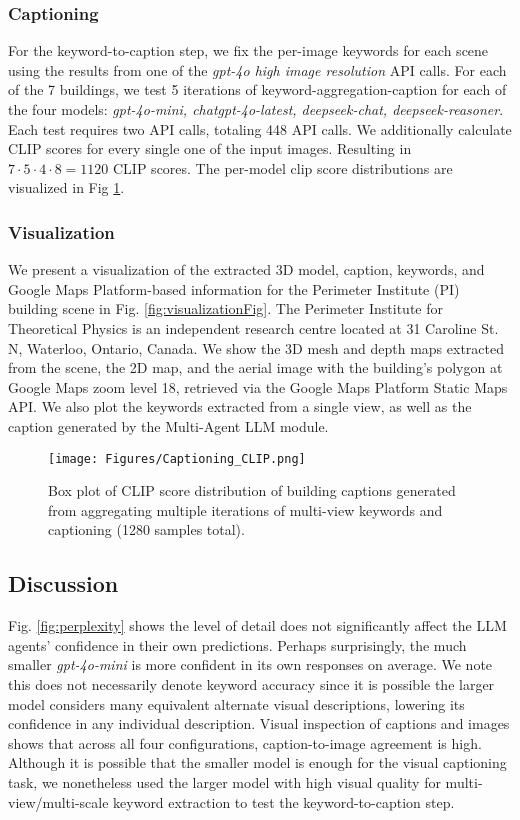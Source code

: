 
\subsubsection{Captioning}
For the keyword-to-caption step, we fix the per-image keywords for each scene using the results from one of the \textit{gpt-4o high image resolution} API calls. For each of the 7 buildings, we test 5 iterations of keyword-aggregation-caption for each of the four models: \textit{gpt-4o-mini, chatgpt-4o-latest, deepseek-chat, deepseek-reasoner}. Each test requires two API calls, totaling 448 API calls. We additionally calculate CLIP scores for every single one of the input images. Resulting in $7\cdot5\cdot4\cdot8 = 1120$ CLIP scores. The per-model clip score distributions are visualized in Fig \ref{fig:4ModelsCaptionCLIp}.

\subsubsection{Visualization}
We present a visualization of the extracted 3D model, caption, keywords, and Google Maps Platform-based information for the Perimeter Institute (PI) building scene in Fig. \ref{fig:visualizationFig}. The Perimeter Institute for Theoretical Physics is an independent research centre located at 31 Caroline St. N, Waterloo, Ontario, Canada. We show the 3D mesh and depth maps extracted from the scene, the 2D map, and the aerial image with the building's polygon at Google Maps zoom level 18, retrieved via the Google Maps Platform Static Maps API. We also plot the keywords extracted from a single view, as well as the caption generated by the Multi-Agent LLM module.
\begin{figure}[htpb]
\centering
\texttt{[image: Figures/Captioning\_CLIP.png]}
\caption{Box plot of CLIP score distribution of building captions generated from aggregating multiple iterations of multi-view keywords and captioning (1280 samples total).}\label{fig:4ModelsCaptionCLIp}
\end{figure}




\subsection{Discussion}
Fig. \ref{fig:perplexity} shows the level of detail does not significantly affect the LLM agents' confidence in their own predictions. Perhaps surprisingly, the much smaller \textit{gpt-4o-mini} is more confident in its own responses on average. We note this does not necessarily denote keyword accuracy since it is possible the larger model considers many equivalent alternate visual descriptions, lowering its confidence in any individual description. Visual inspection of captions and images shows that across all four configurations, caption-to-image agreement is high. Although it is possible that the smaller model is enough for the visual captioning task, we nonetheless used the larger model with high visual quality for multi-view/multi-scale keyword extraction to test the keyword-to-caption step.

